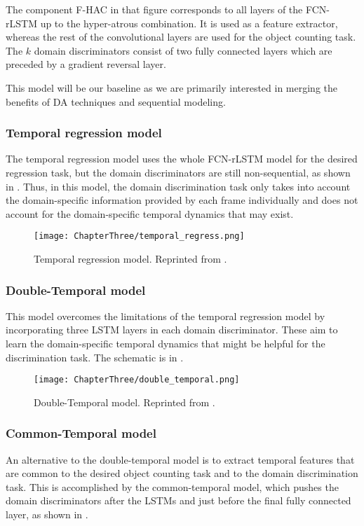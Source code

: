 The component F-HAC in that figure corresponds to all layers of the FCN-rLSTM up to the hyper-atrous combination. It is used as a feature extractor, whereas the rest of the convolutional layers are used for the object counting task. The $k$ domain discriminators consist of two fully connected layers which are preceded by a gradient reversal layer. 

This model will be our baseline as we are primarily interested in merging the benefits of DA techniques and sequential modeling.

\subsubsection{Temporal regression model}
The temporal regression model uses the whole FCN-rLSTM model for the desired regression task, but the domain discriminators are still non-sequential, as shown in . Thus, in this model, the domain discrimination task only takes into account the domain-specific information provided by each frame individually and does not account for the domain-specific temporal dynamics that may exist.

\begin{figure}[h!]
	\centering
	\texttt{[image: ChapterThree/temporal\_regress.png]}
	\caption{Temporal regression model. Reprinted from \citet{ThesisFrancisco}.}
	\label{fig:temporal_regress_model}
\end{figure}

\subsubsection{Double-Temporal model}
This model overcomes the limitations of the temporal regression model by incorporating three LSTM layers in each domain discriminator. These aim to learn the domain-specific temporal dynamics that might be helpful for the discrimination task. The schematic is in .

\begin{figure}[!ht]
	\centering
	\texttt{[image: ChapterThree/double\_temporal.png]}
	\caption{Double-Temporal model. Reprinted from \citet{ThesisFrancisco}.}
	\label{fig:double_temporal_model}
\end{figure}

\subsubsection{Common-Temporal model}
An alternative to the double-temporal model is to extract temporal features that are common to the desired object counting task and to the domain discrimination task. This is accomplished by the common-temporal model, which pushes the domain discriminators after the LSTMs and just before the final fully connected layer, as shown in .

